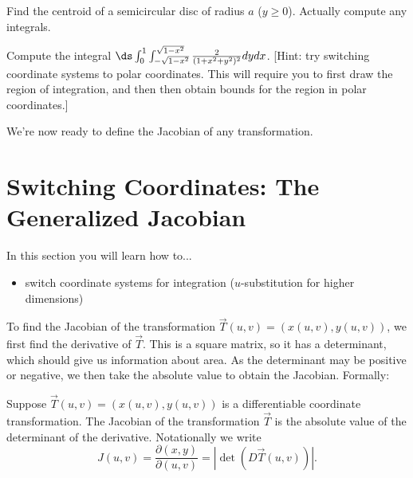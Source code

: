 \begin{problem}
Find the centroid of a semicircular disc of radius $a$ ($y\geq 0$). Actually compute any integrals.  


\end{problem}

\begin{problem}
Compute the integral $\ds \int_{0}^{1}\int_{-\sqrt{1-x^2}}^{\sqrt{1-x^2}} \frac{2}{(1+x^2+y^2)^2}dydx$. [Hint: try switching coordinate systems to polar coordinates.  This will require you to first draw the region of integration, and then then obtain bounds for the region in polar coordinates.]
\end{problem}



We're now ready to define the Jacobian of any transformation.

\section{Switching Coordinates: The Generalized Jacobian}
In this section you will learn how to...
\begin{itemize}
\item switch coordinate systems for integration ($u$-substitution for higher dimensions)
\end{itemize}

\vskip0.2cm

 To find the Jacobian of the transformation $\vec T(u,v)=(x(u,v), y(u,v))$, we first find the derivative of $\vec T$.  This is a square matrix, so it has a determinant, which should give us information about area. As the determinant may be positive or negative, we then take the absolute value to obtain the Jacobian. Formally:
\begin{definition}
 Suppose $\vec T(u,v)=(x(u,v),y(u,v))$ is a differentiable coordinate transformation. The Jacobian of the transformation $\vec T$ is the absolute value of the determinant of the derivative. 
 Notationally we write 
$$J(u,v) = \frac{\partial (x,y)}{\partial (u,v)} = |\det(D\vec T(u,v))|.$$
\end{definition}


